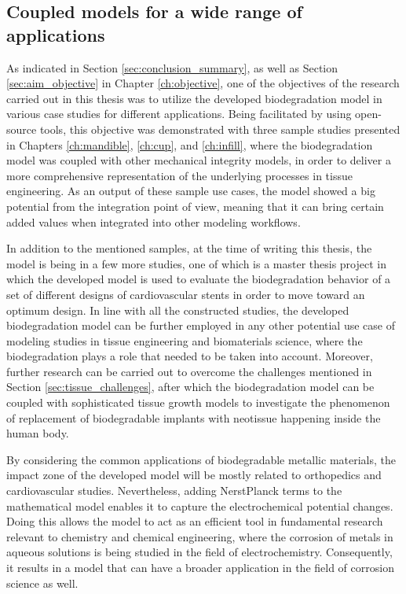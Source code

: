 \subsection{Coupled models for a wide range of applications}

As indicated in Section \ref{sec:conclusion_summary}, as well as Section \ref{sec:aim_objective} in Chapter \ref{ch:objective}, one of the objectives of the research carried out in this thesis was to utilize the developed biodegradation model in various case studies for different applications. Being facilitated by using open-source tools, this objective was demonstrated with three sample studies presented in Chapters \ref{ch:mandible}, \ref{ch:cup}, and \ref{ch:infill}, where the biodegradation model was coupled with other mechanical integrity models, in order to deliver a more comprehensive representation of the underlying processes in tissue engineering. As an output of these sample use cases, the model showed a big potential from the integration point of view, meaning that it can bring certain added values when integrated into other modeling workflows. 

In addition to the mentioned samples, at the time of writing this thesis, the model is being in a few more studies, one of which is a master thesis project in which the developed model is used to evaluate the biodegradation behavior of a set of different designs of cardiovascular stents in order to move toward an optimum design. In line with all the constructed studies, the developed biodegradation model can be further employed in any other potential use case of modeling studies in tissue engineering and biomaterials science, where the biodegradation plays a role that needed to be taken into account. Moreover, further research can be carried out to overcome the challenges mentioned in Section \ref{sec:tissue_challenges}, after which the biodegradation model can be coupled with sophisticated tissue growth models to investigate the phenomenon of replacement of biodegradable implants with neotissue happening inside the human body.

By considering the common applications of biodegradable metallic materials, the impact zone of the developed model will be mostly related to orthopedics and cardiovascular studies. Nevertheless, adding NerstPlanck terms to the mathematical model enables it to capture the electrochemical potential changes. Doing this allows the model to act as an efficient tool in fundamental research relevant to chemistry and chemical engineering, where the corrosion of metals in aqueous solutions is being studied in the field of electrochemistry. Consequently, it results in a model that can have a broader application in the field of corrosion science as well.





\cleardoublepage


